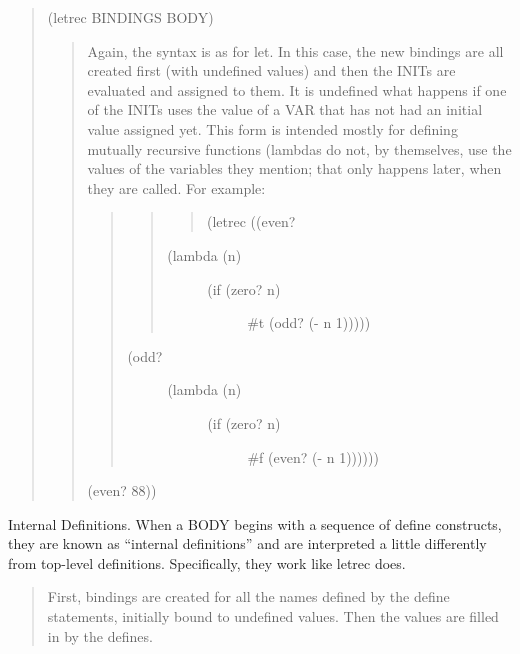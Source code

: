 \documentclass[letterpaper,10pt,dvipdfmx]{sphinxmanual}
\begin{document}
\begin{quote}
(letrec BINDINGS BODY)
\begin{quote}

Again, the syntax is as for let. In this case, the new bindings are all created first (with undefined values) and then the INITs are evaluated and assigned to them. It is undefined what happens if one of the INITs uses the value of a VAR that has not had an initial value assigned yet. This form is intended mostly for defining mutually recursive functions (lambdas do not, by themselves, use the values of the variables they mention; that only happens later, when they are called. For example:
\begin{quote}
\begin{quote}
\begin{quote}

(letrec ((even?
\end{quote}
\begin{description}
\item[{(lambda (n)}] \leavevmode\begin{description}
\item[{(if (zero? n)}] \leavevmode
\#t
(odd? (- n 1)))))

\end{description}

\end{description}
\end{quote}
\begin{description}
\item[{(odd?}] \leavevmode\begin{description}
\item[{(lambda (n)}] \leavevmode\begin{description}
\item[{(if (zero? n)}] \leavevmode
\#f
(even? (- n 1))))))

\end{description}

\end{description}

\end{description}
\end{quote}

(even? 88))
\end{quote}
\end{quote}

Internal Definitions. When a BODY begins with a sequence of define constructs, they are known as ``internal definitions'' and are interpreted a little differently from top-level definitions. Specifically, they work like letrec does.
\begin{quote}

First, bindings are created for all the names defined by the define statements, initially bound to undefined values.
Then the values are filled in by the defines.
\end{quote}
\end{document}
